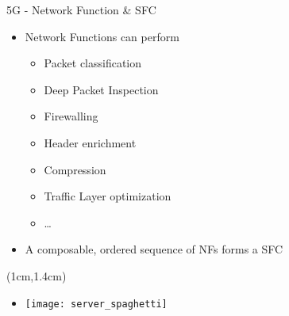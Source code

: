 \begin{frame}{5G - Network Function \& SFC}

  \begin{itemize}
  \item[]<1-> Network Functions can perform
    \begin{itemize}
    \item<2-> Packet classification
    \item<3-> Deep Packet Inspection
    \item<4-> Firewalling
    \item<5-> Header enrichment
    \item<6-> Compression
    \item<7-> Traffic Layer optimization
    \item<8-> \dots
    \end{itemize}
  \item[]<9-> A composable, ordered sequence of NFs forms a SFC

  \end{itemize}

  \begin{textblock*}{5cm}(1cm,1.4cm)
    \begin{itemize}
      \item[]<10-> \texttt{[image: server\_spaghetti]}
    \end{itemize}
  \end{textblock*}
\end{frame}

